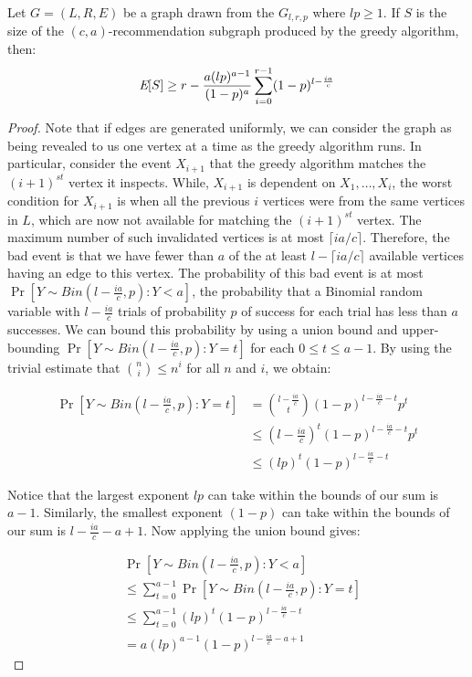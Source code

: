 \begin{thm}
Let $G=(L,R,E)$ be a graph drawn from the $G_{l,r,p}$ where $lp \geq 1$. If $S$ is the size of the $(c,a)$-recommendation subgraph produced by the greedy algorithm, then:
\[ \emph{\text{E}}[S] \geq r - \frac{a(lp)^{a-1}}{(1-p)^a} \sum_{i=0}^{r-1}(1-p)^{l-\frac{ia}{c}}\]
\end{thm}
\begin{proof}
Note that if edges are generated uniformly, we can consider the
graph as being revealed to us one vertex at a time as the greedy
algorithm runs. In particular, consider the event $X_{i+1}$ that the
greedy algorithm matches the $(i+1)^{st}$ vertex it inspects. While,
$X_{i+1}$ is dependent on $X_1,\ldots, X_i$, the worst condition for
$X_{i+1}$ is when all the previous $i$ vertices were from the same
vertices in $L$, which are now not available for matching the
$(i+1)^{st}$ vertex. The maximum number of such invalidated vertices
is at most $\lceil ia/c \rceil$. Therefore, the bad event
is that we have fewer than $a$ of the at least $l-\lceil ia/c \rceil$ 
available vertices having an edge to this vertex. The probability of this
bad event is at most $\Pr[Y\sim Bin(l-\frac{ia}{c},p): Y < a]$, the
probability that a Binomial random variable with $l - \frac{ia}{c}$
trials of probability $p$ of success for each trial has less than $a$
successes. We can bound this probability by using a union bound and
upper-bounding $\Pr[Y\sim Bin(l-\frac{ia}{c},p): Y = t]$ for each 
$0 \leq t \leq a-1$. By using the trivial estimate that
$\binom{n}{i} \leq n^i$ for all $n$ and $i$, we obtain:

\begin{align*}
      \Pr[Y\sim Bin(l-\frac{ia}{c},p): Y = t]
&=    \binom{l-\frac{ia}{c}}{t} (1-p)^{l-\frac{ia}{c}-t}p^{t} \\
&\leq \left(l-\frac{ia}{c}\right)^t (1-p)^{l-\frac{ia}{c}-t} p^{t} \\
&\leq (lp)^t (1-p)^{l-\frac{ia}{c}-t} 
\end{align*}

Notice that the largest exponent $lp$ can take within the bounds of
our sum is $a-1$. Similarly, the smallest exponent $(1-p)$ can take
within the bounds of our sum is $l-\frac{ia}{c}-a+1$. Now applying
the union bound gives:

\begin{align*}
&           \Pr[Y\sim Bin(l-\frac{ia}{c},p): Y < a] \\
&\leq  \sum_{t=0}^{a-1} \Pr[Y\sim Bin(l-\frac{ia}{c},p): Y = t] \\
&\leq  \sum_{t=0}^{a-1} (lp)^t (1-p)^{l-\frac{ia}{c}-t} \\
&=     a(lp)^{a-1} (1-p)^{l-\frac{ia}{c}-a+1}
\end{align*}


\end{proof}
